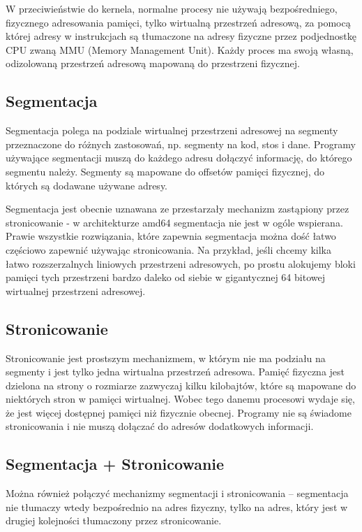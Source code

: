 W przeciwieństwie do kernela, normalne procesy nie używają bezpośredniego, fizycznego adresowania pamięci, tylko wirtualną przestrzeń adresową, za pomocą której adresy w instrukcjach są tłumaczone na adresy fizyczne przez podjednostkę CPU zwaną MMU (Memory Management Unit). Każdy proces ma swoją własną, odizolowaną przestrzeń adresową mapowaną do przestrzeni fizycznej.

\subsection{Segmentacja}
Segmentacja polega na podziale wirtualnej przestrzeni adresowej na segmenty przeznaczone do różnych zastosowań, np. segmenty na kod, stos i dane. Programy używające segmentacji muszą do każdego adresu dołączyć informację, do którego segmentu należy. Segmenty są mapowane do offsetów pamięci fizycznej, do których są dodawane używane adresy.

Segmentacja jest obecnie uznawana ze przestarzały mechanizm zastąpiony przez stronicowanie - w architekturze amd64 segmentacja nie jest w ogóle wspierana. Prawie wszystkie rozwiązania, które zapewnia segmentacja można dość łatwo częściowo zapewnić używając stronicowania. Na przykład, jeśli chcemy kilka łatwo rozszerzalnych liniowych przestrzeni adresowych, po prostu alokujemy bloki pamięci tych przestrzeni bardzo daleko od siebie w gigantycznej 64 bitowej wirtualnej przestrzeni adresowej.

\subsection{Stronicowanie}
Stronicowanie jest prostszym mechanizmem, w którym nie ma podziału na segmenty i jest tylko jedna wirtualna przestrzeń adresowa. Pamięć fizyczna jest dzielona na strony o rozmiarze zazwyczaj kilku kilobajtów, które są mapowane do niektórych stron w pamięci wirtualnej. Wobec tego danemu procesowi wydaje się, że jest więcej dostępnej pamięci niż fizycznie obecnej. Programy nie są świadome stronicowania i nie muszą dołączać do adresów dodatkowych informacji.

\subsection{Segmentacja + Stronicowanie}

Można również połączyć mechanizmy segmentacji i stronicowania -- segmentacja nie tłumaczy wtedy bezpośrednio na adres fizyczny, tylko na adres, który jest w drugiej kolejności tłumaczony przez stronicowanie.

